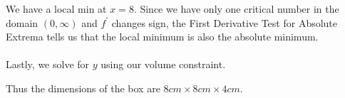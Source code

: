 \documentclass[10pt]{article}
\begin{document}
{{{\begin{center}
\end{center}
}
We have a local min at $x=8$.  Since we have only one critical number in the domain $(0,\infty)$ and $f^{\prime}$ changes sign, the First Derivative Test for Absolute Extrema tells us that the local minimum is also the absolute minimum.  \\\\
Lastly, we solve for $y$ using our volume constraint.

Thus the dimensions of the box are $8cm \times 8 cm\times 4cm$.
}
}

\end{document}
